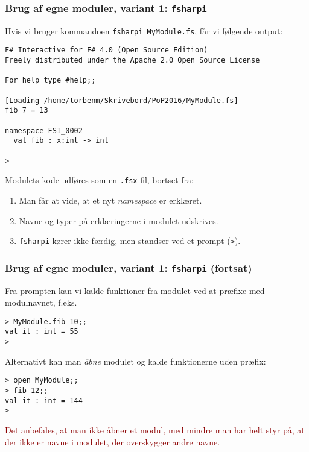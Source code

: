 \documentclass{beamer}
\begin{document}
\begin{frame}[fragile=singleslide]
\frametitle{Brug af egne moduler, variant 1: \texttt{fsharpi}}

Hvis vi bruger kommandoen \texttt{fsharpi MyModule.fs}, får vi
følgende output:


\renewcommand{\baselinestretch}{0.82}
{\small
\begin{verbatim}
F# Interactive for F# 4.0 (Open Source Edition)
Freely distributed under the Apache 2.0 Open Source License

For help type #help;;

[Loading /home/torbenm/Skrivebord/PoP2016/MyModule.fs]
fib 7 = 13

namespace FSI_0002
  val fib : x:int -> int

>
\end{verbatim}
}
\renewcommand{\baselinestretch}{1.0}

Modulets kode udføres som  en \texttt{.fsx} fil, bortset fra:

\begin{enumerate}
\item Man får at vide, at et nyt \emph{namespace} er erklæret.

\item Navne og typer på erklæringerne i modulet udskrives.

\item \texttt{fsharpi} kører ikke færdig, men standser ved et prompt
  (\texttt{>}).
\end{enumerate}

\end{frame}

\begin{frame}[fragile=singleslide]
\frametitle{Brug af egne moduler, variant 1: \texttt{fsharpi} (fortsat)}

Fra prompten kan vi kalde funktioner fra modulet ved at præfixe med
modulnavnet, f.eks.


\renewcommand{\baselinestretch}{0.82}
{\small
\begin{verbatim}
> MyModule.fib 10;;
val it : int = 55
> 
\end{verbatim}
}
\renewcommand{\baselinestretch}{1.0}

Alternativt kan man \emph{åbne} modulet og kalde funktionerne uden
præfix:

\renewcommand{\baselinestretch}{0.82}
{\small
\begin{verbatim}
> open MyModule;;
> fib 12;;
val it : int = 144
> 
\end{verbatim}
}
\renewcommand{\baselinestretch}{1.0}

\textcolor{darkred}{Det anbefales, at man ikke åbner et modul, med mindre man har helt styr
på, at der ikke er navne i modulet, der overskygger andre navne.}

\end{frame}
\end{document}
